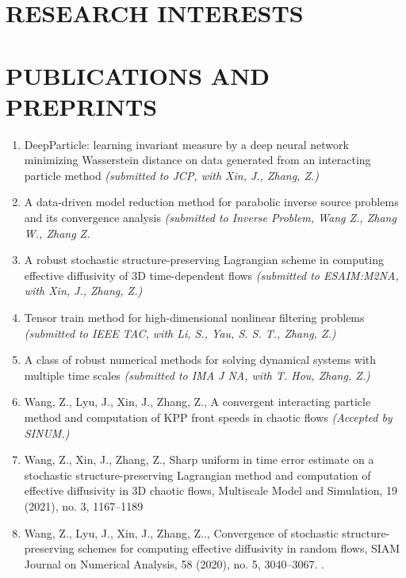 \documentclass[11pt,a4paper]{moderncv}        %
\let\oldsection\section
\renewcommand{\section}[1]{\oldsection{\uppercase{#1}}}
\begin{document}
\section{Research Interests}
\section{Publications and Preprints}
\begin{enumerate}
	\item{DeepParticle: learning invariant measure by a deep neural network minimizing Wasserstein distance on data generated from an interacting particle method \textsl{(submitted to JCP, with Xin, J., Zhang, Z.)}}
	\item{A data-driven model reduction method for parabolic inverse source problems and its convergence analysis \textsl{(submitted to Inverse Problem, Wang Z., Zhang W., Zhang Z.}}
	\item{A robust stochastic structure-preserving Lagrangian scheme in computing effective diffusivity of 3D time-dependent flows  \textsl{(submitted to ESAIM:M2NA, with Xin, J., Zhang, Z.)}}
	\item{Tensor train method for high-dimensional nonlinearfiltering problems  \textsl{(submitted to IEEE TAC, with Li, S., Yau, S. S. T., Zhang, Z.)}}
	\item{A class of robust numerical methods for solving dynamical systems with multiple time scales  \textsl{(submitted to IMA J NA, with T. Hou, Zhang, Z.)}}
	\item{Wang, Z., Lyu, J., Xin, J., Zhang, Z., A convergent interacting particle method and computation of KPP front speeds in chaotic flows \textsl{(Accepted by SINUM.)}}
	\item{Wang, Z., Xin, J., Zhang, Z., Sharp uniform in time error estimate on a stochastic structure-preserving Lagrangian method and computation of effective diffusivity in 3D chaotic flows, Multiscale Model and Simulation, 19 (2021), no. 3, 1167–1189}
	\item{Wang, Z., Lyu, J., Xin, J., Zhang, Z.., Convergence of stochastic structure-preserving schemes for computing effective diffusivity in random flows, SIAM Journal on Numerical Analysis, 58 (2020), no. 5, 3040–3067. .}

\end{enumerate}
\end{document}
